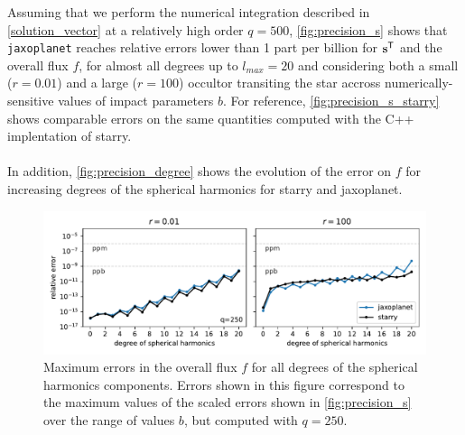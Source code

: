 \documentclass[modern]{aastex631}
\begin{document}
Assuming that we perform the numerical integration described in \autoref{solution_vector} at a relatively high order $q=500$, \autoref{fig:precision_s} shows that \texttt{jaxoplanet} reaches relative errors lower than 1 part per billion for ${\mathbf{s}}^\mathsf{T}$ and the overall flux $f$, for almost all degrees up to $l_{max}=20$ and considering both a small ($r=0.01$) and a large ($r=100$) occultor transiting the star accross numerically-sensitive values of impact parameters $b$. For reference, \autoref{fig:precision_s_starry} shows comparable errors on the same quantities computed with the C++ implentation of \textsf{starry}. \\\\
In addition, \autoref{fig:precision_degree} shows the evolution of the error on $f$ for increasing degrees of the spherical harmonics for \textsf{starry} and \textsf{jaxoplanet}.
\begin{figure}[H]  
    \begin{center}
        \includegraphics[width=\textwidth]{../workflows/figures/error_degree.pdf}
        \caption{Maximum errors in the overall flux $f$ for all degrees of the spherical harmonics components. Errors shown in this figure correspond to the maximum values of the scaled errors shown in \autoref{fig:precision_s} over the range of values $b$, but computed with $q=250$. }
        \label{fig:precision_degree}
    \end{center}
\end{figure}
\end{document}
